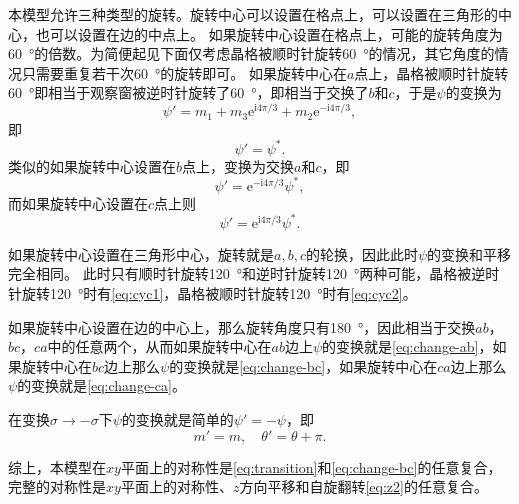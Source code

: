 \documentclass[hyperref, UTF8, a4paper]{ctexart}
\newcommand*{\ii}{\mathrm{i}}
\newcommand*{\ee}{\mathrm{e}}
\begin{document}
本模型允许三种类型的旋转。旋转中心可以设置在格点上，可以设置在三角形的中心，也可以设置在边的中点上。
如果旋转中心设置在格点上，可能的旋转角度为\SI{60}{\degree}的倍数。为简便起见下面仅考虑晶格被顺时针旋转\SI{60}{\degree}的情况，其它角度的情况只需要重复若干次\SI{60}{\degree}的旋转即可。
如果旋转中心在$a$点上，晶格被顺时针旋转\SI{60}{\degree}即相当于观察窗被逆时针旋转了\SI{60}{\degree}，即相当于交换了$b$和$c$，于是$\psi$的变换为
\[
    \psi' = m_1 + m_3 \ee^{\ii 4 \pi / 3} + m_2 \ee^{- \ii 4 \pi /3},
\]
即
\begin{equation}
    \psi' = \psi^*.
    \label{eq:change-bc}
\end{equation}
类似的如果旋转中心设置在$b$点上，变换为交换$a$和$c$，即
\begin{equation}
    \psi' = \ee^{- \ii 4 \pi / 3} \psi^*,
    \label{eq:change-ca}
\end{equation}
而如果旋转中心设置在$c$点上则
\begin{equation}
    \psi' = \ee^{\ii 4 \pi / 3} \psi^*.
    \label{eq:change-ab}
\end{equation}

如果旋转中心设置在三角形中心，旋转就是$a, b, c$的轮换，因此此时$\psi$的变换和平移完全相同。
此时只有顺时针旋转\SI{120}{\degree}和逆时针旋转\SI{120}{\degree}两种可能，晶格被逆时针旋转\SI{120}{\degree}时有\eqref{eq:cyc1}，晶格被顺时针旋转\SI{120}{\degree}时有\eqref{eq:cyc2}。

如果旋转中心设置在边的中心上，那么旋转角度只有\SI{180}{\degree}，因此相当于交换$ab$，$bc$，$ca$中的任意两个，从而如果旋转中心在$ab$边上$\psi$的变换就是\eqref{eq:change-ab}，如果旋转中心在$bc$边上那么$\psi$的变换就是\eqref{eq:change-bc}，如果旋转中心在$ca$边上那么$\psi$的变换就是\eqref{eq:change-ca}。

在变换$\sigma \to - \sigma$下$\psi$的变换就是简单的$\psi' = - \psi$，即
\begin{equation}
    m' = m, \quad \theta' = \theta + \pi.
    \label{eq:z2}
\end{equation}

综上，本模型在$xy$平面上的对称性是\eqref{eq:transition}和\eqref{eq:change-bc}的任意复合，完整的对称性是$xy$平面上的对称性、$z$方向平移和自旋翻转\eqref{eq:z2}的任意复合。
\end{document}

